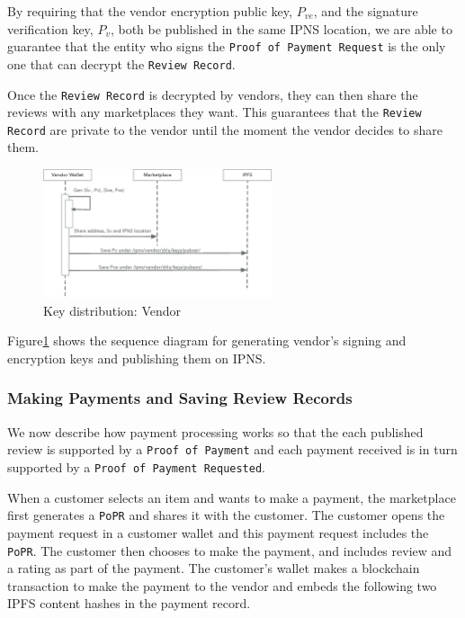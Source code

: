 \documentclass[a4paper]{article}
\begin{document}
By requiring that the vendor encryption public key, $P_{ve}$, and the
signature verification key, $P_v$, both be published in the same IPNS
location, we are able to guarantee that the entity who signs the
\texttt{Proof of Payment Request} is the only one that can decrypt the
\texttt{Review Record}.

Once the \texttt{Review Record} is decrypted by vendors, they can then
share the reviews with any marketplaces they want. This guarantees
that the \texttt{Review Record} are private to the vendor until the
moment the vendor decides to share them.

\begin{figure}
\centering
\includegraphics[width=0.6\textwidth]{../vendor-wallet-init.eps}
\caption{\label{fig:vendor-wallet-init}Key distribution: Vendor}
\end{figure}

Figure\ref{fig:vendor-wallet-init} shows the sequence diagram for
generating vendor's signing and encryption keys and publishing them on
IPNS\@.

\subsubsection{Making Payments and Saving Review Records}

We now describe how payment processing works so that the each
published review is supported by a \texttt{Proof of Payment} and each
payment received is in turn supported by a \texttt{Proof of Payment
  Requested}.

When a customer selects an item and wants to make a payment, the
marketplace first generates a \texttt{PoPR} and shares it with the
customer. The customer opens the payment request in a customer wallet
and this payment request includes the \texttt{PoPR}. The customer then
chooses to make the payment, and includes review and a rating as part
of the payment. The customer's wallet makes a blockchain transaction
to make the payment to the vendor and embeds the following two IPFS
content hashes in the payment record.
\end{document}

